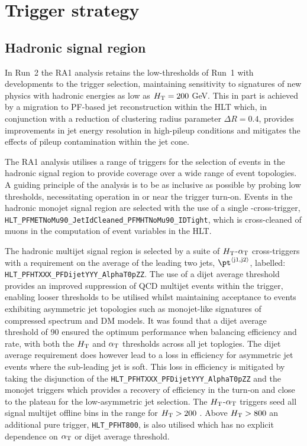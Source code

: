 \section{Trigger strategy}
\label{sec:triggers}


\subsection{Hadronic signal region\label{sec:hadronic_signal_region}}

In Run~2 the RA1 analysis retains the low-thresholds of Run~1 with developments 
to the trigger selection, maintaining sensitivity to signatures of new physics with hadronic 
energies as low as $\mbox{$H_\text{T}$} = 200$ GeV. This in part is achieved by a migration to PF-based 
jet reconstruction within the HLT which, in conjunction with a reduction of clustering radius 
parameter $\Delta R = 0.4$, provides improvements in jet energy resolution in high-pileup 
conditions and mitigates the effects of pileup contamination within the jet cone.

The RA1 analysis utilises a range of triggers for the selection of events in the hadronic signal region
to provide coverage over a wide range of event topologies. A guiding principle of the analysis is to be as
inclusive as possible by probing low thresholds, necessitating operation in or near the trigger turn-on.
Events in the hadronic monojet signal region are selected with the use of a single \mht-\met cross-trigger, 
\verb!HLT_PFMETNoMu90_JetIdCleaned_PFMHTNoMu90_IDTight!, which is cross-cleaned of muons in the computation 
of event variables in the HLT. 

The hadronic multijet signal region is selected by a suite of $\mbox{$H_\text{T}$}$-$\alpha_{\text{T}}$ cross-triggers 
with a requirement on the average \pt of the leading two jets, $\pt^{\rm \left<j1,j2\right>}$, labelled: 
\verb!HLT_PFHTXXX_PFDijetYYY_AlphaT0pZZ!. The use of a dijet average threshold provides an improved 
suppression of QCD multijet events within the trigger,
enabling looser \alphat thresholds to be utilised whilst maintaining acceptance to events exhibiting asymmetric jet 
topologies such as monojet-like signatures of compressed spectrum and DM models. It was found that a dijet average
threshold of 90 \GeV ensured the optimum performance when balancing efficiency and rate, with both the $\mbox{$H_\text{T}$}$ and $\alpha_{\text{T}}$
thresholds across all jet toplogies. The dijet average requirement does however lead to a loss in efficiency for 
asymmetric jet events where the sub-leading jet is soft. This loss in efficiency is mitigated by taking the 
disjunction of the \verb!HLT_PFHTXXX_PFDijetYYY_AlphaT0pZZ! and the monojet triggers which provides a recovery 
of efficiency in the turn-on and close to the plateau for the low-\scalht asymmetric jet selection. 
The $\mbox{$H_\text{T}$}$-$\alpha_{\text{T}}$ triggers seed all signal multijet offline 
bins in the range for $\mbox{$H_\text{T}$} > 200$ \GeV. Above $\mbox{$H_\text{T}$} > 800$ an additional pure \scalht trigger, \verb!HLT_PFHT800!, 
is also utilised which has no explicit dependence on $\alpha_{\text{T}}$ or dijet average threshold. 

